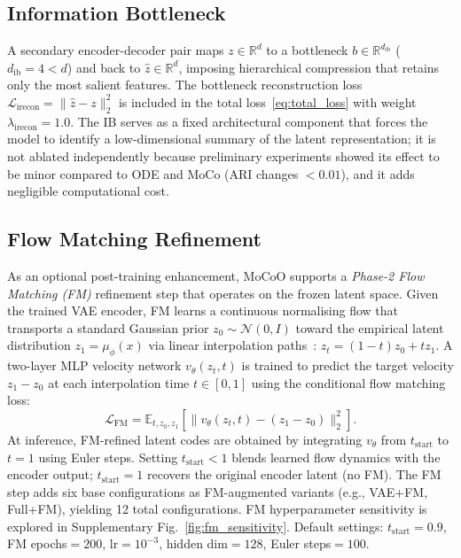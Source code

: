 \documentclass[biology,article,submit,pdftex]{Definitions/mdpi}
\begin{document}
\subsection{Information Bottleneck}
\label{sec:method:ib}

A secondary encoder-decoder pair maps $z \in \mathbb{R}^{d}$ to a bottleneck $b \in \mathbb{R}^{d_{\mathrm{ib}}}$ ($d_{\mathrm{ib}} = 4 < d$) and back to $\hat{z} \in \mathbb{R}^{d}$, imposing hierarchical compression that retains only the most salient features. The bottleneck reconstruction loss $\mathcal{L}_{\mathrm{irecon}} = \|\hat{z} - z\|_2^2$ is included in the total loss~\eqref{eq:total_loss} with weight $\lambda_{\mathrm{irecon}} = 1.0$. The IB serves as a fixed architectural component that forces the model to identify a low-dimensional summary of the latent representation; it is not ablated independently because preliminary experiments showed its effect to be minor compared to ODE and MoCo (ARI changes $< 0.01$), and it adds negligible computational cost.

\subsection{Flow Matching Refinement}
\label{sec:method:fm}

As an optional post-training enhancement, MoCoO supports a \emph{Phase-2 Flow Matching (FM)} refinement step that operates on the frozen latent space. Given the trained VAE encoder, FM learns a continuous normalising flow that transports a standard Gaussian prior $z_0 \sim \mathcal{N}(0, I)$ toward the empirical latent distribution $z_1 = \mu_\phi(x)$ via linear interpolation paths~\cite{lipman2023flow}: $z_t = (1 - t) z_0 + t z_1$. A two-layer MLP velocity network $v_\theta(z_t, t)$ is trained to predict the target velocity $z_1 - z_0$ at each interpolation time $t \in [0, 1]$ using the conditional flow matching loss:
\begin{equation}
    \mathcal{L}_{\mathrm{FM}} = \mathbb{E}_{t, z_0, z_1}\!\left[\| v_\theta(z_t, t) - (z_1 - z_0) \|_2^2\right].
    \label{eq:fm_loss}
\end{equation}
At inference, FM-refined latent codes are obtained by integrating $v_\theta$ from $t_{\mathrm{start}}$ to $t{=}1$ using Euler steps. Setting $t_{\mathrm{start}} < 1$ blends learned flow dynamics with the encoder output; $t_{\mathrm{start}} = 1$ recovers the original encoder latent (no FM). The FM step adds six base configurations as FM-augmented variants (e.g., VAE+FM, Full+FM), yielding 12 total configurations. FM hyperparameter sensitivity is explored in Supplementary Fig.~\ref{fig:fm_sensitivity}. Default settings: $t_{\mathrm{start}}{=}0.9$, FM epochs${=}200$, lr${=}10^{-3}$, hidden dim${=}128$, Euler steps${=}100$.
\end{document}

